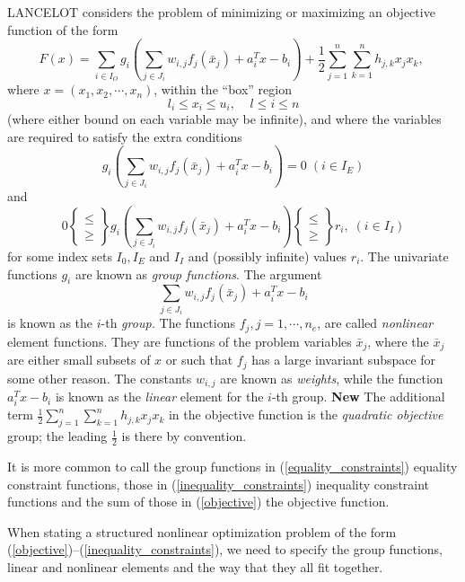 \documentclass[a4paper]{article}
\newcommand{\beqn}[1]{\begin{equation}\label{#1}}
\newcommand{\eeqn}{\end{equation}}
\newcommand{\req}[1]{(\ref{#1})}
\newcommand{\ms}{\;\;\;\;}
\newcommand{\sfrac}[2]{{\scriptstyle \frac{#1}{#2}}}
\newcommand{\half}{\sfrac{1}{2}}
\begin{document}
{\sf LANCELOT} considers the problem of minimizing or maximizing
an objective function
of the form
\beqn{objective}
F( x )
= \sum_{i \in I_O}g_i \left (
\sum_{j \in J_i} w_{i,j} f_j (\bar{x}_j) +  a_i^T x  - b_i  \right)
+ \half \sum_{j=1}^n \sum_{k=1}^n h_{j,k} x_j x_k ,
\; 
\eeqn
where $x = (x_1, x_2,\cdots, x_n)$, within the ``box'' region
\beqn{box}
l_i \leq x_i \leq u_i, \ms l \leq i \leq n
\eeqn
(where either bound on each variable may be  infinite),  and where the
variables are required to satisfy the extra conditions
\beqn{equality_constraints}
g_i \left(
\sum_{j \in J_{i}} w_{i,j}f_j (\bar{x}_j) + a_i^T x - b_i  \right) = 0
\; (i \in I_E)
\eeqn
and
\beqn{inequality_constraints}
0 \left \{ \begin{array}{ll}
           \leq \\ \geq
           \end{array} \right\}
g_i \left(
\sum_{j \in J_{i}} w_{i,j} f_j(\bar{x}_j) + a_i^T x - b_i \right)
\left\{ \begin{array}{ll}
\leq \\ \geq
\end{array} \right\}
 r_i,
\; (i \in I_I)
\eeqn
for some index  sets  $I_0, I_E$  and $I_I$   and  (possibly infinite)
values $r_i$.  The univariate functions $g_i$ are known as  {\em group
functions}.
The argument
\[ \sum_{j \in J_i} w_{i,j} f_j(\bar{x}_j) + a_i^T x - b_i \]
is known as  the  $i$-th {\em  group.}
The functions $f_j, j=1,\cdots,
n_e$, are  called   {\em  nonlinear} element functions.
 They are  functions of the  problem  variables
$\bar{x}_j$, where  the
$\bar{x}_j$ are either small subsets of  $x$ or such  that $f_j$ has a
large invariant   subspace
for  some other  reason.  The  constants  $w_{i,j}$ are  known as {\em
weights}, while
the function $a_i^T  x -  b_i$  is known  as the {\em linear}
element for the $i$-th group.
{\bf New}
The additional term $\half \sum_{j=1}^n \sum_{k=1}^n h_{j,k} x_j x_k$
in the objective function is the {\em quadratic objective} group; the
leading $\half$ is there by convention.

It    is    more  common    to     call   the   group    functions
in \req{equality_constraints}  equality  constraint functions,
those   in
\req{inequality_constraints} inequality constraint functions
and the sum of those
in \req{objective} the objective function.

When   stating a  structured  nonlinear optimization  problem    of  the  form
\req{objective}--\req{inequality_constraints}, we  need to  specify  the group
functions,
linear and nonlinear elements
and the way that they all fit together.
\end{document}
